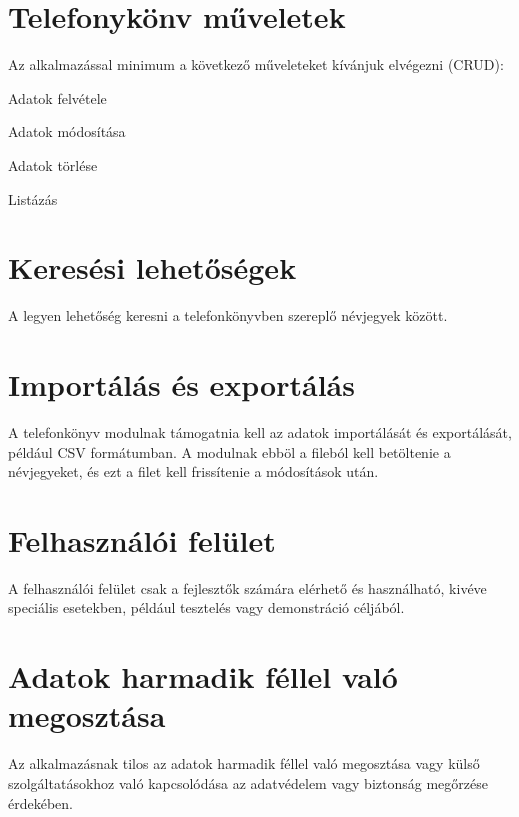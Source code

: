 \documentclass[11pt, letterpaper, openany, oneside]{book}
\begin{document}
\section{Telefonykönv műveletek}
Az alkalmazással minimum a következő műveleteket kívánjuk elvégezni (CRUD):

\vspace{5px}
\begin{compactitem}
    \item Adatok felvétele
    \item Adatok módosítása
    \item Adatok törlése
    \item Listázás
\end{compactitem}

\section{Keresési lehetőségek}
A legyen lehetőség keresni a telefonkönyvben szereplő névjegyek között. 

\newpage

\section{Importálás és exportálás}
A telefonkönyv modulnak támogatnia kell az adatok importálását és exportálását, például CSV formátumban. A modulnak ebböl a fileból kell betöltenie a névjegyeket, és ezt a filet kell frissítenie a módosítások után.

\section{Felhasználói felület}
A felhasználói felület csak a fejlesztők számára elérhető és használható, kivéve speciális esetekben, például tesztelés vagy demonstráció céljából.

\section{Adatok harmadik féllel való megosztása}
Az alkalmazásnak tilos az adatok harmadik féllel való megosztása vagy külső szolgáltatásokhoz való kapcsolódása az adatvédelem vagy biztonság megőrzése érdekében.
\end{document}
